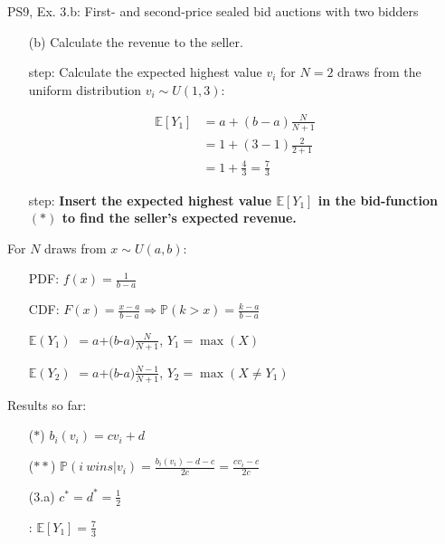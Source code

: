 \begin{frame}{PS9, Ex. 3.b: First- and second-price sealed bid auctions with two bidders}
    \begin{multicols}{2}
      \begin{itemize}
        \item[(b)] Calculate the revenue to the seller.
        \item[\nth{1} step:] Calculate the expected highest value $v_i$ for $N=2$ draws from the uniform distribution $v_i\sim U(1,3)$:
      \end{itemize}
      \vspace{-8pt}
      \begin{align*}
        \mathbb{E}[Y_1]&=a+(b-a)\frac{N}{N+1}\\
                       &=1+(3-1)\frac{2}{2+1}\\
                       &=1+\frac{4}{3}=\frac{7}{3}
      \end{align*}
      \vspace{-12pt}
      \begin{itemize}
        \item[\nth{2} step:] \textbf{Insert the expected highest value $\mathbb{E}[Y_1]$ in the bid-function $(*)$  to find the seller's expected revenue.}
      \end{itemize}
      \vfill\null\columnbreak
      For $N$ draws from $x\sim U(a, b):$
      \vspace{-6pt}
      \begin{enumerate}
        \item[PDF:] $f(x)=\frac{1}{b-a}$
        \item[CDF:] $F(x)=\frac{x-a}{b-a}\Rightarrow\mathbb{P}(k>x)=\frac{k-a}{b-a}$
        \item[$\mathbb{E}(Y_1)$] $=a$+$(b$-$a)\frac{N}{N+1}$, $Y_1=\max(X)$
        \item[$\mathbb{E}(Y_2)$] $=a$+$(b$-$a)\frac{N-1}{N+1}$, $Y_2=\max(X\neq Y_1)$
      \end{enumerate}
      \vspace{-6pt}
      Results so far:
      \vspace{-6pt}
      \begin{itemize}
        \item[($*$)]  $b_i(v_i) = cv_i+d$
        \item[($**$)] $\mathbb{P}(i\ wins|v_i)=\frac{b_i(v_i)-d-c}{2c}=\frac{cv_i-c}{2c}$
        \item[(3.a)]    $c^*=d^*=\frac{1}{2}$
        \item[\nth{1}:] $\mathbb{E}[Y_1]=\frac{7}{3}$
      \end{itemize}
      \vfill\null
    \end{multicols}
\end{frame}
